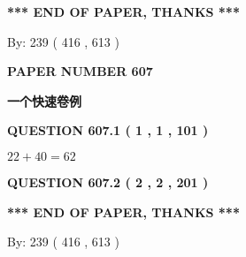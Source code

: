 \documentclass{ctexart}
\begin{document}
   
 \vspace{0.2in}
 
   
   
   
   
\vspace{1.0in} 
{\textbf{\large{ *** END OF PAPER, THANKS *** }}} 
   
   
\hspace{1.0in} By: 
 239 ( 416 ,  613 )
   
   
   
   
\newpage 
\setcounter{page}{ 
   607001 } 
   
   
   
   
 {\textbf{ \Large{ PAPER NUMBER  607  }}}
   
   
\vspace{0.2in}
   
   
   
   
   
   
 \vspace{0.2in}
{\LARGE {\textbf{ 一个快速卷例}}}
   
   
  
\vspace{0.2in}
  
{\textbf{\Large{QUESTION
607.1 
 ( 1 , 1 , 101 )
}}}
  
  
 
 

$ %
22 +  %
40=   %
62$
 
 
  
\vspace{0.2in}
  
{\textbf{\Large{QUESTION
607.2 
 ( 2 , 2 , 201 )
}}}
  
  
   
   
 \vspace{0.2in}
 
   
   
   
   
\vspace{1.0in} 
{\textbf{\large{ *** END OF PAPER, THANKS *** }}} 
   
   
\hspace{1.0in} By: 
 239 ( 416 ,  613 )
   
   
   
   
\newpage 
\setcounter{page}{ 
   608001 } 
   
   
   
\end{document}
